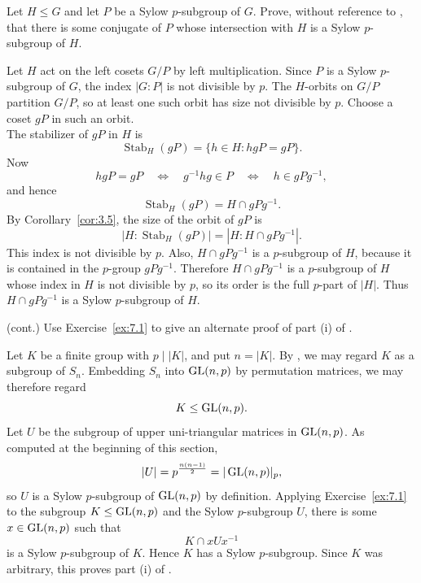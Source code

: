 \documentclass[../Odyssey_Project.tex]{subfiles}
\begin{document}
\begin{exercise}
\label{ex:7.1}
Let $H \leq G$ and let $P$ be a Sylow $p$-subgroup of $G$. Prove, without reference to , that there is some conjugate of $P$ whose intersection with $H$ is a Sylow $p$-subgroup of $H$.
\end{exercise}
\begin{solution}
Let $H$ act on the left cosets $G/P$ by left multiplication. Since $P$ is a Sylow $p$-subgroup of $G$, the index $|G:P|$ is not divisible by $p$. The $H$-orbits on $G/P$ partition $G/P$, so at least one such orbit has size not divisible by $p$. Choose a coset $gP$ in such an orbit.\\
The stabilizer of $gP$ in $H$ is
\[
    \operatorname{Stab}_H(gP)=\{h\in H: hgP=gP\}.
\]
Now
\[
    hgP=gP
    \quad\Longleftrightarrow\quad
    g^{-1}hg\in P
    \quad\Longleftrightarrow\quad
    h\in gPg^{-1},
\]
and hence
\[
    \operatorname{Stab}_H(gP)=H\cap gPg^{-1}.
\]
By Corollary~\ref{cor:3.5}, the size of the orbit of $gP$ is
\[
    |H:\operatorname{Stab}_H(gP)|=|H:H\cap gPg^{-1}|.
\]
This index is not divisible by $p$. Also, $H\cap gPg^{-1}$ is a $p$-subgroup of $H$, because it is contained in the $p$-group $gPg^{-1}$. Therefore $H\cap gPg^{-1}$ is a $p$-subgroup of $H$ whose index in $H$ is not divisible by $p$, so its order is the full $p$-part of $|H|$. Thus $H\cap gPg^{-1}$ is a Sylow $p$-subgroup of $H$.
\end{solution}

\begin{exercise}
\label{ex:7.2}
(cont.) Use Exercise~\ref{ex:7.1} to give an alternate proof of part (i) of .
\end{exercise}
\begin{solution}
Let $K$ be a finite group with $p\mid |K|$, and put $n=|K|$. By , we may regard $K$ as a subgroup of $S_n$. Embedding $S_n$ into $\operatorname{GL}(n,p)$ by permutation matrices, we may therefore regard
\[
    K\leq \operatorname{GL}(n,p).
\]
Let $U$ be the subgroup of upper uni-triangular matrices in $\operatorname{GL}(n,p)$. As computed at the beginning of this section,
\[
    |U|=p^{\frac{n(n-1)}{2}}=|\operatorname{GL}(n,p)|_p,
\]
so $U$ is a Sylow $p$-subgroup of $\operatorname{GL}(n,p)$ by definition. Applying Exercise~\ref{ex:7.1} to the subgroup $K\leq \operatorname{GL}(n,p)$ and the Sylow $p$-subgroup $U$, there is some $x\in \operatorname{GL}(n,p)$ such that
\[
    K\cap xUx^{-1}
\]
is a Sylow $p$-subgroup of $K$. Hence $K$ has a Sylow $p$-subgroup. Since $K$ was arbitrary, this proves part (i) of .
\end{solution}
\end{document}
